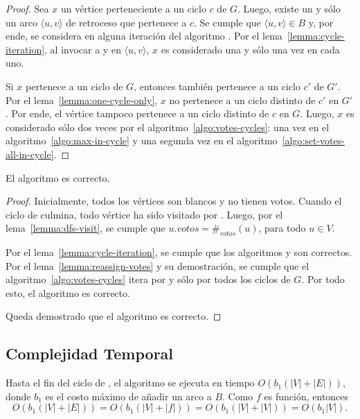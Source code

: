 \begin{proof}
    Sea $x$ un v\'ertice perteneciente a un ciclo $c$ de $G$. Luego, existe un y s\'olo un arco $\langle u, v \rangle$ de retroceso que pertenece a $c$. Se cumple que $\langle u, v \rangle \in B$ y, por ende, se considera en alguna iteraci\'on del algoritmo \cyclevotescaption. Por el lema~\ref{lemma:cycle-iteration}, al invocar a \maxincyclecaption \;y \setvotestoallincyclecaption \;en $\langle u, v \rangle$, $x$ es considerado una y s\'olo una vez en cada uno. 

    Si $x$ pertenece a un ciclo de $G$, entonces tambi\'en pertenece a un ciclo  $c'$ de $G'$. Por el lema~\ref{lemma:one-cycle-only}, $x$ no pertenece a un ciclo distinto de $c'$ en $G'$. Por ende, el v\'ertice tampoco pertenece a un ciclo distinto de $c$ en $G$. Luego, $x$ es considerado s\'olo dos veces por el algoritmo~\ref{algo:votes-cycles}: una vez en el algoritmo~\ref{algo:max-in-cycle} y una segunda vez en el algoritmo~\ref{algo:set-votes-all-in-cycle}.
\end{proof}



\begin{theorem}
    El algoritmo \dfscaption \;es correcto.
\end{theorem}

\begin{proof}
    Inicialmente, todos los v\'ertices son blancos y no tienen votos. Cuando el ciclo de \dfscaption \;culmina, todo v\'ertice ha sido visitado por \dfsvisitcaption. Luego, por el lema~\ref{lemma:dfs-visit}, se cumple que $u.votos = \#_{votos}(u)$, para todo $u \in V$.

    Por el lema~\ref{lemma:cycle-iteration}, se cumple que los algoritmos \maxincyclecaption \;y \setvotestoallincyclecaption \;son correctos.  Por el lema~\ref{lemma:reassign-votes} y su demostraci\'on, se cumple que el algoritmo~\ref{algo:votes-cycles} itera por y s\'olo por todos los ciclos de $G$. Por todo esto, el algoritmo \cyclevotescaption \;es correcto.

    Queda demostrado que el algoritmo \dfscaption \;es correcto.
\end{proof}


\subsection{Complejidad Temporal}
Hasta el fin del ciclo de \dfscaption, el algoritmo se ejecuta en tiempo $O(b_1(|V| + |E|))$, donde $b_1$ es el costo m\'aximo de a\~nadir un arco a $B$. Como $f$ es funci\'on, entonces 
$$
O(b_1(|V| + |E|)) = O(b_1(|V| + |f|)) = O(b_1(|V| + |V|)) = O(b_1|V|).
$$

